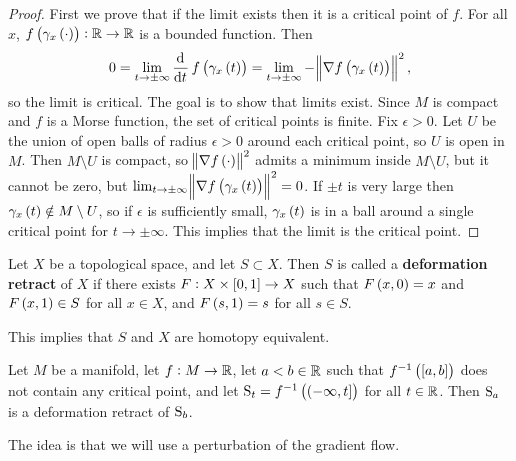 \begin{proof}
First we prove that if the limit exists then it is a critical point of $ f $. For all $ x $, $ f\br{\gamma_x\br{\cdot}} : \RR \to \RR $ is a bounded function. Then
$$ 0 = \lim_{t \to \pm\infty} \dod{}{t}f\br{\gamma_x\br{t}} = \lim_{t \to \pm\infty} -\norm{\nabla f\br{\gamma_x\br{t}}}^2, $$
so the limit is critical. The goal is to show that limits exist. Since $ M $ is compact and $ f $ is a Morse function, the set of critical points is finite. Fix $ \epsilon > 0 $. Let $ U $ be the union of open balls of radius $ \epsilon > 0 $ around each critical point, so $ U $ is open in $ M $. Then $ M \setminus U $ is compact, so $ \norm{\nabla f\br{\cdot}}^2 $ admits a minimum inside $ M \setminus U $, but it cannot be zero, but $ \lim_{t \to \pm\infty} \norm{\nabla f\br{\gamma_x\br{t}}}^2 = 0 $. If $ \pm t $ is very large then $ \gamma_x\br{t} \notin M \setminus U $, so if $ \epsilon $ is sufficiently small, $ \gamma_x\br{t} $ is in a ball around a single critical point for $ t \to \pm\infty $. This implies that the limit is the critical point.
\end{proof}


\begin{definition}
Let $ X $ be a topological space, and let $ S \subset X $. Then $ S $ is called a \textbf{deformation retract} of $ X $ if there exists $ F : X \times \sbr{0, 1} \to X $ such that $ F\br{x, 0} = x $ and $ F\br{x, 1} \in S $ for all $ x \in X $, and $ F\br{s, 1} = s $ for all $ s \in S $.
\end{definition}

This implies that $ S $ and $ X $ are homotopy equivalent.

\begin{theorem}
\label{thm:4.8}
Let $ M $ be a manifold, let $ f : M \to \RR $, let $ a < b \in \RR $ such that $ f^{-1}\br{\sbr{a, b}} $ does not contain any critical point, and let $ \S_t = f^{-1}\br{\intoc{-\infty, t}} $ for all $ t \in \RR $. Then $ \S_a $ is a deformation retract of $ \S_b $.
\end{theorem}

The idea is that we will use a perturbation of the gradient flow.

